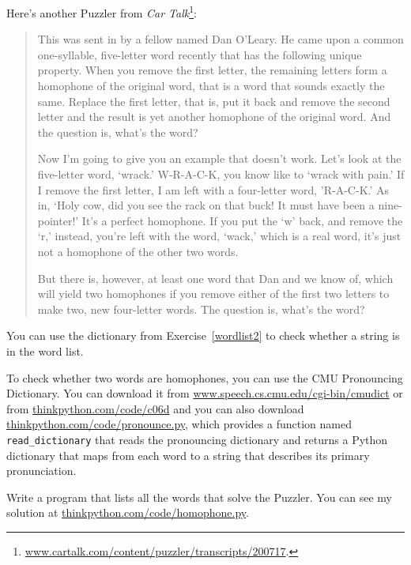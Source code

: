 \documentclass[10pt]{book}
\begin{document}
\begin{ex}

Here's another Puzzler from {\em Car
Talk}\footnote{\url{www.cartalk.com/content/puzzler/transcripts/200717}.}:

\begin{quote}
This was sent in by a fellow named Dan O'Leary. He came upon a common
one-syllable, five-letter word recently that has the following unique
property. When you remove the first letter, the remaining letters form
a homophone of the original word, that is a word that sounds exactly
the same. Replace the first letter, that is, put it back and remove
the second letter and the result is yet another homophone of the
original word. And the question is, what's the word?

Now I'm going to give you an example that doesn't work. Let's look at
the five-letter word, `wrack.' W-R-A-C-K, you know like to `wrack with
pain.' If I remove the first letter, I am left with a four-letter
word, 'R-A-C-K.' As in, `Holy cow, did you see the rack on that buck!
It must have been a nine-pointer!' It's a perfect homophone. If you
put the `w' back, and remove the `r,' instead, you're left with the
word, `wack,' which is a real word, it's just not a homophone of the
other two words.

But there is, however, at least one word that Dan and we know of,
which will yield two homophones if you remove either of the first two
letters to make two, new four-letter words. The question is, what's
the word?
\end{quote}


You can use the dictionary from Exercise~\ref{wordlist2} to check
whether a string is in the word list.

To check whether two words are homophones, you can use the CMU
Pronouncing Dictionary.  You can download it from
\url{www.speech.cs.cmu.edu/cgi-bin/cmudict} or from
\url{thinkpython.com/code/c06d} and you can also download
\url{thinkpython.com/code/pronounce.py}, which provides a function
named \verb"read_dictionary" that reads the pronouncing dictionary and
returns a Python dictionary that maps from each word to a string that
describes its primary pronunciation.

Write a program that lists all the words that solve the Puzzler.
You can see my solution at \url{thinkpython.com/code/homophone.py}.

\end{ex}
\end{document}
